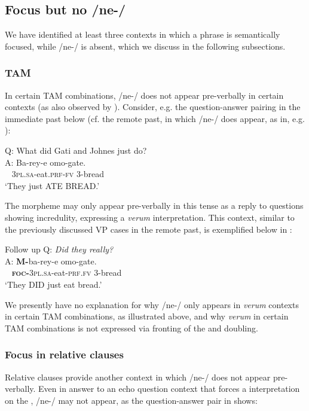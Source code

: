 \documentclass[output=paper,modfonts]{langscibook}
\begin{document}
 
\subsection{Focus but no /ne-/}\label{sec:landmann:6.1}



We have identified at least three contexts in which a phrase is semantically focused, while /ne-/ is absent, which we discuss in the following subsections.

\subsubsection{TAM}


In certain TAM combinations, /ne-/ does not appear pre-verbally in certain contexts (as also observed by \citealt{Mwita2008}). Consider, e.g. the question-answer pairing in the immediate past below (cf. the remote past, in which /ne-/ does appear, as in, e.g. ):


\ea\label{ex:landmann:44}
Q: What did Gati and Johnes just do?\\
\gll A: Ba-rey-e omo-gate.\\
     ~ \textsc{3pl}.\textsc{sa}-eat.\textsc{prf}-\textsc{fv} 3-bread\\
\glt ‘They just ATE BREAD.’
\z

The morpheme may only appear pre-verbally in this tense as a reply to questions showing incredulity, expressing a \textit{verum}  interpretation. This context, similar to the previously discussed VP  cases in the remote past, is exemplified below in :

\ea\label{ex:landmann:45} 
{Follow up Q: \textit{Did they really?}}\\
\gll A: \textbf{M-}ba-rey-e omo-gate.\\
     ~ \textsc{\textbf{foc-}}\textsc{3pl}.\textsc{sa}-eat-\textsc{prf}.\textsc{fv} 3-bread\\
\glt ‘They DID just eat bread.’
\z

We presently have no explanation for why /ne-/ only appears in \textit{verum}  contexts in certain TAM combinations, as illustrated above, and why \textit{verum}  in certain TAM combinations is not expressed via fronting of the   and doubling.


\subsubsection{Focus in relative clauses} 
Relative clauses provide another context in which /ne-/ does not appear pre-verbally. Even in answer to an echo question context that forces a  interpretation on the , /ne-/ may not appear, as the question-answer pair in  shows:
\end{document}
